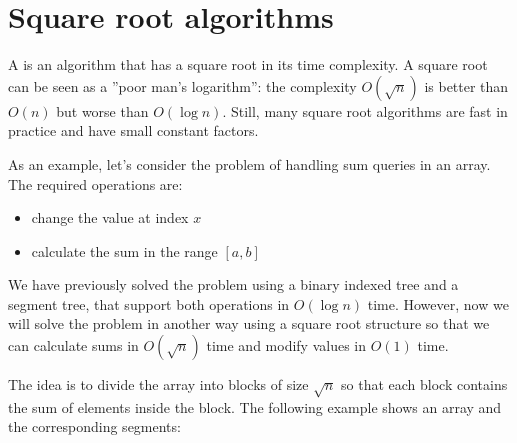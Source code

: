 \chapter{Square root algorithms}


A  is an algorithm
that has a square root in its time complexity.
A square root can be seen as a ''poor man's logarithm'':
the complexity $O(\sqrt n)$ is better than $O(n)$
but worse than $O(\log n)$.
Still, many square root algorithms are fast in practice
and have small constant factors.

As an example, let's consider the problem of
handling sum queries in an array.
The required operations are:

\begin{itemize}
\item change the value at index $x$
\item calculate the sum in the range $[a,b]$
\end{itemize}

We have previously solved the problem using
a binary indexed tree and a segment tree,
that support both operations in $O(\log n)$ time.
However, now we will solve the problem
in another way using a square root structure
so that we can calculate sums in $O(\sqrt n)$ time
and modify values in $O(1)$ time.

The idea is to divide the array into blocks
of size $\sqrt n$ so that each block contains
the sum of elements inside the block.
The following example shows an array and the
corresponding segments:

\begin{center}
\end{center}

